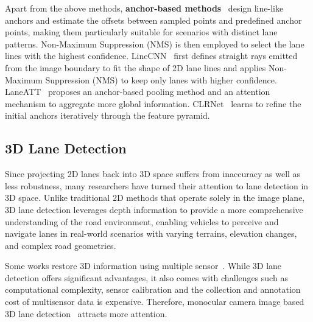 Apart from the above methods, \textbf{anchor-based methods}~\cite{li2019line, liu2021condlanenet, tabelini2021keep, zheng2022clrnet, ran2023flamnet, huang2023anchor3dlane} design line-like anchors and estimate the offsets between sampled points and predefined anchor points, making them particularly suitable for scenarios with distinct lane patterns.
Non-Maximum Suppression (NMS) is then employed to select the lane lines with the highest confidence.
LineCNN~\cite{li2019line} first defines straight rays emitted from the image boundary to fit the shape of 2D lane lines and applies Non-Maximum Suppression (NMS) to keep only lanes with higher confidence.
LaneATT~\cite{tabelini2021keep} proposes an anchor-based pooling method and an attention mechanism to aggregate more global information.
CLRNet~\cite{zheng2022clrnet} learns to refine the initial anchors iteratively through the feature pyramid.


\subsection{3D Lane Detection}
\label{subsec:3d}
Since projecting 2D lanes back into 3D space suffers from inaccuracy as well as less robustness, many researchers have turned their attention to lane detection in 3D space.
Unlike traditional 2D methods that operate solely in the image plane, 3D lane detection leverages depth information to provide a more comprehensive understanding of the road environment, enabling vehicles to perceive and navigate lanes in real-world scenarios with varying terrains, elevation changes, and complex road geometries.

Some works restore 3D information using multiple sensor~\cite{cordts2016cityscapes, luo2022m, chen2022persformer}.
While 3D lane detection offers significant advantages, it also comes with challenges such as computational complexity, sensor calibration and the collection and annotation cost of multisensor data is expensive.
Therefore, monocular camera image based 3D lane detection~\cite{efrat20203d, garnett20193d, guo2020gen, liu2022learning, yan2022once, huang2023anchor3dlane, wang2023bev} attracts more attention.

